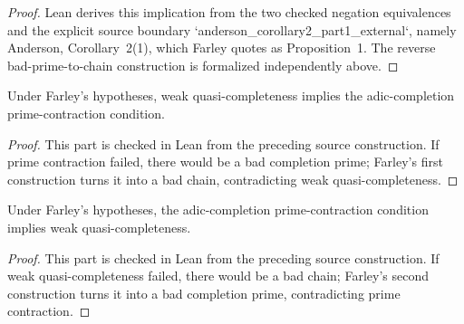\begin{proof}
  Lean derives this implication from the two checked negation equivalences and
  the explicit source boundary `anderson_corollary2_part1_external`, namely
  Anderson, Corollary~2(1), which Farley quotes as Proposition~1.  The reverse
  bad-prime-to-chain construction is formalized independently above.
\end{proof}

\begin{lemma}
  \label{lem:weakly_quasi_complete_to_adic_completion_prime_contraction}
  Under Farley's hypotheses, weak quasi-completeness implies the
  adic-completion prime-contraction condition.
\end{lemma}

\begin{proof}
  This part is checked in Lean from the preceding source construction.  If
  prime contraction failed, there would be a bad completion prime; Farley's
  first construction turns it into a bad chain, contradicting weak
  quasi-completeness.
\end{proof}

\begin{lemma}
  \label{lem:adic_completion_prime_contraction_to_weakly_quasi_complete}
  Under Farley's hypotheses, the adic-completion prime-contraction condition
  implies weak quasi-completeness.
\end{lemma}

\begin{proof}
  This part is checked in Lean from the preceding source construction.  If
  weak quasi-completeness failed, there would be a bad chain; Farley's second
  construction turns it into a bad completion prime, contradicting prime
  contraction.
\end{proof}

